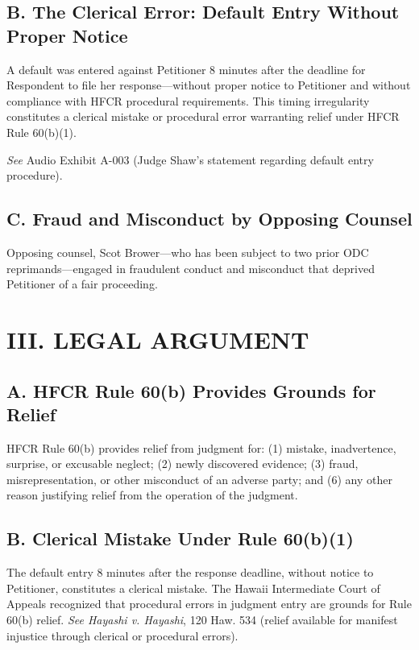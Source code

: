 \documentclass[12pt]{article}
\begin{document}
\subsection*{B. The Clerical Error: Default Entry Without Proper Notice}

A default was entered against Petitioner 8 minutes after the deadline for Respondent to file her response—without proper notice to Petitioner and without compliance with HFCR procedural requirements. This timing irregularity constitutes a clerical mistake or procedural error warranting relief under HFCR Rule 60(b)(1).

\textit{See} Audio Exhibit A-003 (Judge Shaw's statement regarding default entry procedure).

\subsection*{C. Fraud and Misconduct by Opposing Counsel}

Opposing counsel, Scot Brower—who has been subject to two prior ODC reprimands—engaged in fraudulent conduct and misconduct that deprived Petitioner of a fair proceeding.

\section*{III. LEGAL ARGUMENT}

\subsection*{A. HFCR Rule 60(b) Provides Grounds for Relief}

HFCR Rule 60(b) provides relief from judgment for: (1) mistake, inadvertence, surprise, or excusable neglect; (2) newly discovered evidence; (3) fraud, misrepresentation, or other misconduct of an adverse party; and (6) any other reason justifying relief from the operation of the judgment.

\subsection*{B. Clerical Mistake Under Rule 60(b)(1)}

The default entry 8 minutes after the response deadline, without notice to Petitioner, constitutes a clerical mistake. The Hawaii Intermediate Court of Appeals recognized that procedural errors in judgment entry are grounds for Rule 60(b) relief. \textit{See Hayashi v. Hayashi}, 120 Haw. 534 (relief available for manifest injustice through clerical or procedural errors).
\end{document}
